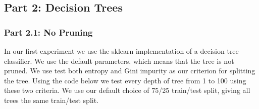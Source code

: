 \documentclass[
  letterpaper,
  DIV=11,
  numbers=noendperiod]{scrartcl}
\begin{document}
\hypertarget{part-2-decision-trees}{%
\subsection{Part 2: Decision Trees}\label{part-2-decision-trees}}

\hypertarget{part-2.1-no-pruning}{%
\subsubsection{Part 2.1: No Pruning}\label{part-2.1-no-pruning}}

In our first experiment we use the sklearn implementation of a decision
tree classifier. We use the default parameters, which means that the
tree is not pruned. We use test both entropy and Gini impurity as our
criterion for splitting the tree. Using the code below we test every
depth of tree from 1 to 100 using these two criteria. We use our default
choice of 75/25 train/test split, giving all trees the same train/test
split.
\end{document}
